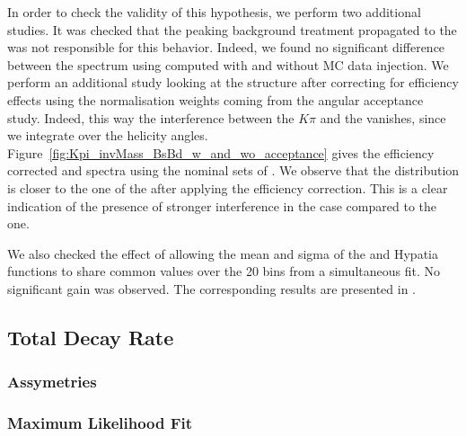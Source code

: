 In order to check the validity of this hypothesis, we perform two additional studies. 
It was checked that the peaking background treatment propagated to the \sWeights was not responsible for this behavior.
Indeed, we found no significant difference between the \Bs \mkpi spectrum using \sWeights computed with and without MC 
data injection. We perform an additional study looking at the \mkpi structure after correcting for efficiency effects 
using the normalisation weights coming from the angular acceptance study. Indeed, this way the interference between the 
$K\pi$ \swave and the \Kstarz \pwave vanishes, since we integrate over the helicity angles. Figure~\ref{fig:Kpi_invMass_BsBd_w_and_wo_acceptance}
 gives the efficiency corrected \Bs and \Bd \mkpi spectra using the nominal sets of \sWeights. We observe that the \Bs \mkpi distribution
 is closer to the one of the \Bd after applying the efficiency correction. This is a clear indication of the presence of stronger interference 
in the \Bs case compared to the \Bd one. 

We also checked the effect of allowing the mean and sigma of the \Bs and \Bd Hypatia functions to share common values over the 20 bins from
a simultaneous fit. No significant gain was observed. The corresponding results are presented in . 


\subsection{Total Decay Rate}
\label{Total Decay Rate}

\subsubsection{\CP Assymetries}

\subsubsection{Maximum Likelihood Fit}


